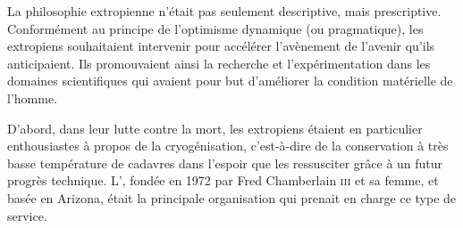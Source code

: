 La philosophie extropienne n'était pas seulement descriptive, mais prescriptive. Conformément au principe de l'optimisme dynamique (ou pragmatique), les extropiens souhaitaient intervenir pour accélérer l'avènement de l'avenir qu'ils anticipaient. Ils promouvaient ainsi la recherche et l'expérimentation dans les domaines scientifiques qui avaient pour but d'améliorer la condition matérielle de l'homme.

D'abord, dans leur lutte contre la mort, les extropiens étaient en particulier enthousiastes à propos de la cryogénisation, c'est-à-dire de la conservation à très basse température de cadavres dans l'espoir que les ressusciter grâce à un futur progrès technique. L', fondée en 1972 par Fred Chamberlain \textsc{iii} et sa femme, et basée en Arizona, était la principale organisation qui prenait en charge ce type de service.

